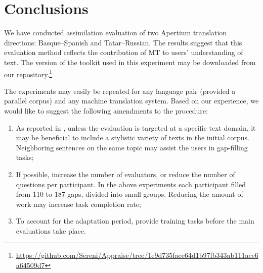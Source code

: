 \documentclass[11pt]{article}
\newcommand{\comment}[1]{}
\begin{document}

\section{Conclusions}
\label{sec:conclusion}
We have conducted assimilation evaluation of two Apertium translation directions: Basque--Spanish and Tatar--Russian. The results suggest that this evaluation method reflects the contribution of MT to users' understanding of text. The version of the toolkit used in this 
experiment may be downloaded from our repository.\footnote{{\url{https://github.com/Sereni/Appraise/tree/1e9d735faee64d1b97fb343ab111ace6a64509d7}}}

The experiments may easily be repeated for any language pair (provided a parallel corpus) and
any machine translation system. Based on our experience, we would like to suggest the following amendments to the procedure:
\begin{enumerate}
\item As reported in \cite{oregan13}, unless the evaluation is targeted at a specific text domain, it may be beneficial to include a stylistic variety of texts in the initial corpus. Neighboring sentences on the same topic may assist the users in gap-filling tasks;
\item If possible, increase the number of evaluators, or reduce the number of questions per participant. In the above experiments each participant filled from 110 to 187 gaps, divided into small groups. Reducing the amount of work may increase task completion rate;\comment{MLF's crazy idea: recaptchas?}\comment{EA: the participants did not leave the gaps empty, they just did not attempt the next portions of evaluation after finishing some and getting bored. or did I misunderstand the use of captchas? }
\item To account for the adaptation period, provide training tasks before the main evaluations take place.
\end{enumerate}
\end{document}

